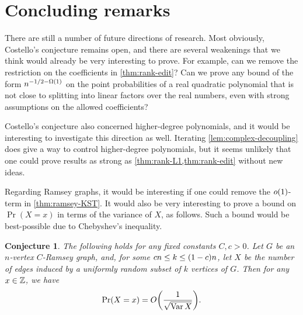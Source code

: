\documentclass{daj}
\theoremstyle{plain}
\theoremstyle{plain}
\theoremstyle{plain}
\theoremstyle{plain}
\theoremstyle{definition}
\theoremstyle{plain}
\newtheorem{conjecture}[thm]{Conjecture}
\theoremstyle{plain}
\theoremstyle{definition}
\theoremstyle{definition}
\theoremstyle{plain}
\let\originalleft\left
\let\originalright\right
\renewcommand{\left}{\mathopen{}\mathclose\bgroup\originalleft}
\renewcommand{\right}{\aftergroup\egroup\originalright}
\begin{document}
\section{Concluding remarks}\label{sec:concluding}

There are still a number of future directions of research. Most
obviously, Costello's conjecture remains open, and there are several weakenings that
we think would already be very interesting to prove. For example,
can we remove the restriction on the coefficients in \cref{thm:rank-edit}? Can we prove any bound of
the form $n^{-1/2-\Omega\left(1\right)}$ on the point probabilities
of a real quadratic polynomial that is not close to splitting into
linear factors over the real numbers, even with strong assumptions
on the allowed coefficients?

Costello's conjecture also concerned higher-degree polynomials, and it would be interesting to investigate this direction as well. Iterating \cref{lem:complex-decoupling} does give a way to control higher-degree polynomials, but it seems unlikely that one could prove results as strong as \cref{thm:rank-L1,thm:rank-edit} without new ideas.

Regarding Ramsey graphs, it would be interesting if one could
remove the $o\left(1\right)$-term in \cref{thm:ramsey-KST}. It would also be very interesting to prove a bound on $\Pr(X=x)$ in terms of the variance of $X$, as follows. Such a bound would be best-possible due to Chebyshev's inequality.

\begin{conjecture}
\label{conj:KST}The following holds for any fixed constants $C,c>0$. Let $G$ be an $n$-vertex $C$-Ramsey graph, and, for some $cn\le k\le\left(1-c\right)n$, let $X$ be the
number of edges induced by a uniformly random subset of $k$ vertices
of $G$. Then for any $x\in\mathbb{Z}$,
we have
\[
\Pr\left(X=x\right)=O\left(\frac{1}{\sqrt{\Var X}}\right).
\]
\end{conjecture}
\end{document}
